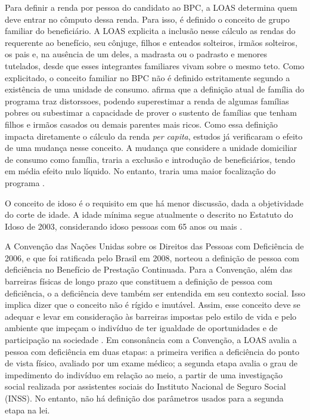 \documentclass[
	12pt,				%
	openright,			%
	twoside,			%
	a4paper,			%
	english,			%
	french,				%
	spanish,			%
	brazil				%
	]{abntex2}
\begin{document}
		Para definir a renda por pessoa do candidato ao BPC, a LOAS determina quem deve entrar no cômputo dessa renda. Para isso, é definido o conceito de grupo familiar do beneficiário. A LOAS explicita a inclusão nesse cálculo as rendas do requerente ao benefício, seu cônjuge, filhos e enteados solteiros, irmãos solteiros, os pais e, na ausência de um deles, a madrasta ou o padrasto e menores tutelados, desde que esses integrantes familiares vivam sobre o mesmo teto. Como explicitado, o conceito familiar no BPC não é definido estritamente segundo a existência de uma unidade de consumo.  afirma que a definição atual de família do programa traz distorssoes, podendo superestimar a renda de algumas famílias pobres ou subestimar a capacidade de prover o sustento de famílias que tenham filhos e irmãos casados ou demais parentes mais ricos. Como essa definição impacta diretamente o cálculo da renda \textit{per capita}, estudos já verificaram o efeito de uma mudança nesse conceito. A mudança que considere a unidade domiciliar de consumo como família, traria a exclusão e introdução de beneficiários, tendo em média efeito nulo líquido. No entanto, traria uma maior focalização do programa \cite{medeiros2009mudancca,fambpcfreitas}.
		
		O conceito de idoso é o requisito em que há menor discussão, dada a objetividade do corte de idade. A idade mínima segue atualmente o descrito no Estatuto do Idoso de 2003, considerando idoso pessoas com 65 anos ou mais \cite{lei_idoso2003}. 
		
		A  Convenção das Nações Unidas sobre os Direitos das Pessoas com Deficiência de 2006, e que foi ratificada pelo Brasil em 2008, norteou a definição de pessoa com deficiência no Benefício de Prestação Continuada. Para a Convenção, além das barreiras físicas de longo prazo que constituem a definição de pessoa com deficiência, o a deficiência deve também ser entendida em seu contexto social. Isso implica dizer que o conceito não é rígido e imutável. Assim, esse conceito deve se adequar e levar em consideração às barreiras impostas pelo estilo de vida e pelo ambiente que impeçam o indivíduo de ter igualdade de oportunidades e de participação na sociedade \cite{onu2006convention}. Em consonância com a Convenção, a LOAS avalia a pessoa com deficiência em duas etapas: a primeira verifica a deficiência do ponto de vista físico, avaliado por um exame médico; a segunda etapa avalia o grau de impedimento do indivíduo em relação ao meio, a partir de uma investigação social realizada por assistentes sociais do Instituto Nacional de Seguro Social (INSS). No entanto, não há definição dos parâmetros usados para a segunda etapa na lei. 
				
\end{document}
